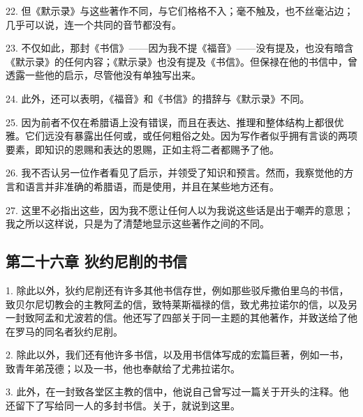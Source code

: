 22. 但《默示录》与这些著作不同，与它们格格不入；毫不触及，也不丝毫沾边；几乎可以说，连一个共同的音节都没有。\par

23. 不仅如此，那封《书信》——因为我不提《福音》——没有提及，也没有暗含《默示录》的任何内容；《默示录》也没有提及《书信》。但保禄在他的书信中，曾透露一些他的启示，尽管他没有单独写出来。\par

24. 此外，还可以表明，《福音》和《书信》的措辞与《默示录》不同。\par

25. 因为前者不仅在希腊语上没有错误，而且在表达、推理和整体结构上都很优雅。它们远没有暴露出任何或，或任何粗俗之处。因为写作者似乎拥有言谈的两项要素，即知识的恩赐和表达的恩赐，正如主将二者都赐予了他。\par

26. 我不否认另一位作者看见了启示，并领受了知识和预言。然而，我察觉他的方言和语言并非准确的希腊语，而是使用，并且在某些地方还有。\par

27. 这里不必指出这些，因为我不愿让任何人以为我说这些话是出于嘲弄的意思；我之所以这样说，只是为了清楚地显示这些著作之间的不同。\par


\subsection{第二十六章 狄约尼削的书信}

1. 除此以外，狄约尼削还有许多其他书信存世，例如那些驳斥撒伯里乌的书信，致贝尔尼切教会的主教阿孟的信，致特莱斯福禄的信，致尤弗拉诺尔的信，以及另一封致阿孟和尤波若的信。他还写了四部关于同一主题的其他著作，并致送给了他在罗马的同名者狄约尼削。\par

2. 除此以外，我们还有他许多书信，以及用书信体写成的宏篇巨著，例如一书，致青年弟茂德；以及一书，他也奉献给了尤弗拉诺尔。\par

3. 此外，在一封致各堂区主教的信中，他说自己曾写过一篇关于开头的注释。他还留下了写给同一人的多封书信。关于，就说到这里。\par

